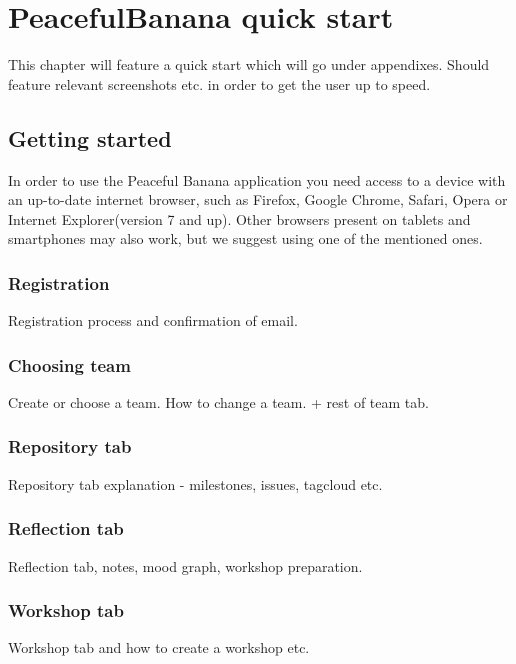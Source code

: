 \chapter{PeacefulBanana quick start}
This chapter will feature a quick start which will go under appendixes. 
Should feature relevant screenshots etc. in order to get the user up to speed. 


\section{Getting started}
In order to use the Peaceful Banana application you need access to a device with an up-to-date internet browser, such as Firefox, Google Chrome, Safari, Opera or Internet Explorer(version 7 and up). Other browsers present on tablets and smartphones may also work, but we suggest using one of the mentioned ones. 

\subsection{Registration}
Registration process and confirmation of email. 
\subsection{Choosing team}
Create or choose a team. How to change a team. + rest of team tab. 
\subsection{Repository tab}
Repository tab explanation - milestones, issues, tagcloud etc.
\subsection{Reflection tab}
Reflection tab, notes, mood graph, workshop preparation.
\subsection{Workshop tab}
Workshop tab and how to create a workshop etc. 


